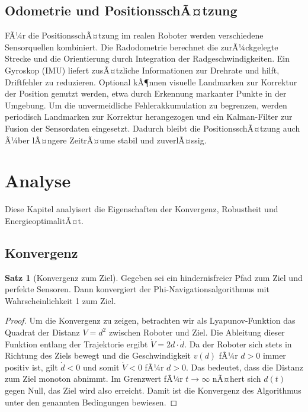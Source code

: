 ﻿\documentclass[a4paper,12pt]{article}
\theoremstyle{definition}
\newtheorem{satz}{Satz}
\begin{document}
\subsection{Odometrie und PositionsschÃ¤tzung}

FÃ¼r die PositionsschÃ¤tzung im realen Roboter werden verschiedene Sensorquellen kombiniert. Die Radodometrie berechnet die zurÃ¼ckgelegte Strecke und die Orientierung durch Integration der Radgeschwindigkeiten. Ein Gyroskop (IMU) liefert zusÃ¤tzliche Informationen zur Drehrate und hilft, Driftfehler zu reduzieren. Optional kÃ¶nnen visuelle Landmarken zur Korrektur der Position genutzt werden, etwa durch Erkennung markanter Punkte in der Umgebung. Um die unvermeidliche Fehlerakkumulation zu begrenzen, werden periodisch Landmarken zur Korrektur herangezogen und ein Kalman-Filter zur Fusion der Sensordaten eingesetzt. Dadurch bleibt die PositionsschÃ¤tzung auch Ã¼ber lÃ¤ngere ZeitrÃ¤ume stabil und zuverlÃ¤ssig.

\section{Analyse}
Diese Kapitel analyisert die Eigenschaften der Konvergenz, Robustheit und EnergieoptimalitÃ¤t.

\subsection{Konvergenz}

\begin{satz}[Konvergenz zum Ziel]
Gegeben sei ein hindernisfreier Pfad zum Ziel und perfekte Sensoren. Dann konvergiert der Phi-Navigationsalgorithmus mit Wahrscheinlichkeit 1 zum Ziel. 
\end{satz}

\begin{proof} Um die Konvergenz zu zeigen, betrachten wir als Lyapunov-Funktion das Quadrat der Distanz $V = d^2$ zwischen Roboter und Ziel. Die Ableitung dieser Funktion entlang der Trajektorie ergibt $\dot{V} = 2d \cdot \dot{d}$. Da der Roboter sich stets in Richtung des Ziels bewegt und die Geschwindigkeit $v(d)$ fÃ¼r $d > 0$ immer positiv ist, gilt $\dot{d} < 0$ und somit $\dot{V} < 0$ fÃ¼r $d > 0$. Das bedeutet, dass die Distanz zum Ziel monoton abnimmt. Im Grenzwert fÃ¼r $t \to \infty$ nÃ¤hert sich $d(t)$ gegen Null, das Ziel wird also erreicht. Damit ist die Konvergenz des Algorithmus unter den genannten Bedingungen bewiesen.
\end{proof}
\end{document}

